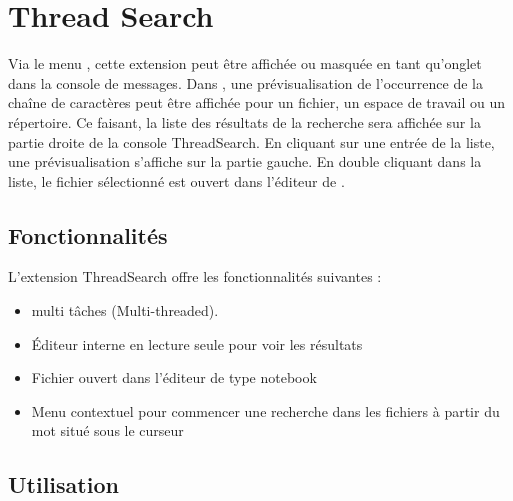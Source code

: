 \section{Thread Search}\label{sec:thread_search}

Via le menu , cette extension peut être affichée ou masquée en tant qu'onglet dans la console de messages. Dans \codeblocks, une prévisualisation de l'occurrence de la chaîne de caractères peut être affichée pour un fichier, un espace de travail ou un répertoire. Ce faisant, la liste des résultats de la recherche sera affichée sur la partie droite de la console ThreadSearch. En cliquant sur une entrée de la liste, une prévisualisation s'affiche sur la partie gauche. En double cliquant dans la liste, le fichier sélectionné est ouvert dans l'éditeur de  \codeblocks.


\subsection{Fonctionnalités}

L'extension ThreadSearch offre les fonctionnalités suivantes :

\begin{itemize}
\item {} multi tâches (Multi-threaded).
\item  Éditeur interne en lecture seule pour voir les résultats
\item Fichier ouvert dans l'éditeur de type notebook
\item Menu contextuel  pour commencer une recherche dans les fichiers à partir du mot situé sous le curseur
\end{itemize}


\subsection{Utilisation}

